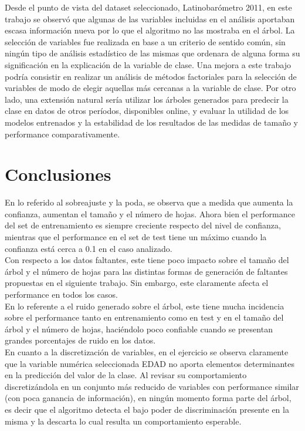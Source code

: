 \documentclass[]{article}
\begin{document}
Desde el punto de vista del dataset seleccionado, Latinobarómetro 2011, en este trabajo se observó que algunas de las variables incluidas en el análisis aportaban escasa información nueva por lo que el algoritmo no las mostraba en el árbol. La selección de variables fue realizada en base a un criterio de sentido común, sin ningún tipo de análisis estadístico de las mismas que ordenara de alguna forma su significación en la explicación de la variable de clase. Una mejora a este trabajo podría consistir en realizar un análisis de métodos factoriales para la selección de variables de modo de elegir aquellas más cercanas a la variable de clase. Por otro lado, una extensión natural sería utilizar los árboles generados para predecir la clase en datos de otros períodos, disponibles online, y evaluar la utilidad de los modelos entrenados y la estabilidad de los resultados de las medidas de tamaño y performance comparativamente.

\section*{Conclusiones}
En lo referido al sobreajuste y la poda, se observa que a medida que aumenta la confianza, aumentan el tamaño y el número de hojas. Ahora bien el performance del set de entrenamiento es siempre creciente respecto del nivel de confianza, mientras que el performance en el set de test tiene un máximo cuando la confianza está cerca a 0.1 en el caso analizado.\\
Con respecto a los datos faltantes, este tiene poco impacto sobre el tamaño del árbol y el número de hojas para las distintas formas de generación de faltantes propuestas en el siguiente trabajo. Sin embargo, este claramente afecta el performance en todos los casos.\\
En lo referente a el ruido generado sobre el árbol, este tiene mucha incidencia sobre el performance tanto en entrenamiento como en test y en el tamaño del árbol y el número de hojas, haciéndolo poco confiable cuando se presentan grandes porcentajes de ruido en los datos.\\
En cuanto a la discretización de variables, en el ejercicio se observa claramente que la variable numérica seleccionada EDAD no aporta elementos determinantes en la predicción del valor de la clase. Al revisar su comportamiento discretizándola en un conjunto más reducido de variables con performance similar (con poca ganancia de información), en ningún momento forma parte del árbol, es decir que el algoritmo detecta el bajo poder de discriminación presente en la misma y la descarta lo cual resulta un comportamiento esperable.




	




\end{document}
